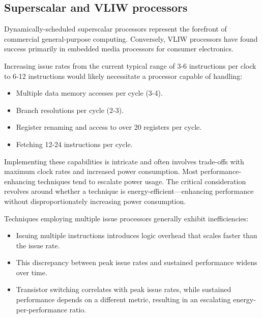 \subsection{Superscalar and VLIW processors}
Dynamically-scheduled superscalar processors represent the forefront of commercial general-purpose computing. 
Conversely, VLIW processors have found success primarily in embedded media processors for consumer electronics. 

Increasing issue rates from the current typical range of 3-6 instructions per clock to 6-12 instructions would likely necessitate a processor capable of handling:
\begin{itemize}
    \item Multiple data memory accesses per cycle (3-4).
    \item Branch resolutions per cycle (2-3).
    \item Register renaming and access to over 20 registers per cycle.
    \item Fetching 12-24 instructions per cycle.
\end{itemize}
Implementing these capabilities is intricate and often involves trade-offs with maximum clock rates and increased power consumption. 
Most performance-enhancing techniques tend to escalate power usage. 
The critical consideration revolves around whether a technique is energy-efficient—enhancing performance without disproportionately increasing power consumption.

Techniques employing multiple issue processors generally exhibit inefficiencies:
\begin{itemize}
    \item Issuing multiple instructions introduces logic overhead that scales faster than the issue rate.
    \item This discrepancy between peak issue rates and sustained performance widens over time.
    \item Transistor switching correlates with peak issue rates, while sustained performance depends on a different metric, resulting in an escalating energy-per-performance ratio.
\end{itemize}

